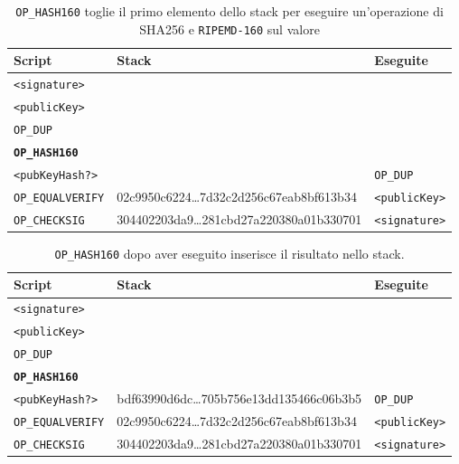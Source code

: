 \begin{enumerate}[1.]
\begin{table}[H]
    \centering
    \begin{tabular}{p{3cm}|p{7.7cm}|p{3cm}}
        Script & Stack & Eseguite\\
        \hline
        \texttt{<signature>}          & &\\
        \texttt{<publicKey>}          & &\\
        \texttt{OP\_DUP}              & &\\
        \texttt{\textbf{OP\_HASH160}} & &\\
        \texttt{<pubKeyHash?>}        &                                            & \texttt{OP\_DUP}\\
        \texttt{OP\_EQUALVERIFY}      & 02c9950c6224\dots7d32c2d256c67eab8bf613b34 & \texttt{<publicKey>}\\
        \texttt{OP\_CHECKSIG}         & 304402203da9\dots281cbd27a220380a01b330701 & \texttt{<signature>}\\
    \end{tabular}
    \caption{\texttt{OP\_HASH160} toglie il primo elemento dello stack per eseguire un'operazione di SHA256 e \texttt{RIPEMD-160} sul valore}
\end{table}

\begin{table}[H]
    \centering
    \begin{tabular}{p{3cm}|p{7.7cm}|p{3cm}}
        Script & Stack & Eseguite\\
        \hline
        \texttt{<signature>}            & &\\
        \texttt{<publicKey>}            & &\\
        \texttt{OP\_DUP}                & &\\
        \texttt{\textbf{OP\_HASH160}}   & &\\
        \texttt{<pubKeyHash?>}          & bdf63990d6dc\dots705b756e13dd135466c06b3b5 & \texttt{OP\_DUP}\\
        \texttt{OP\_EQUALVERIFY}        & 02c9950c6224\dots7d32c2d256c67eab8bf613b34 & \texttt{<publicKey>}\\
        \texttt{OP\_CHECKSIG}           & 304402203da9\dots281cbd27a220380a01b330701 & \texttt{<signature>}\\
    \end{tabular}
    \caption{\texttt{OP\_HASH160} dopo aver eseguito inserisce il risultato nello stack.}
\end{table}


\end{enumerate}
